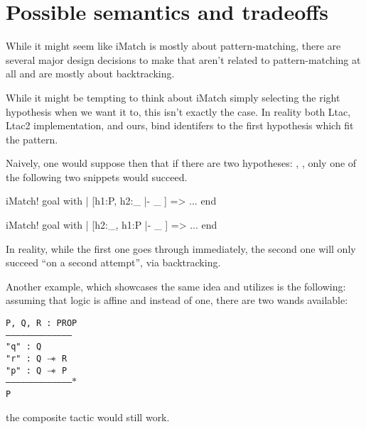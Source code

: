 \section{Possible semantics and tradeoffs}

While it might seem like iMatch is mostly about pattern-matching, there are several major design decisions to make that aren't related to pattern-matching at all and are mostly about backtracking.

While it might be tempting to think about iMatch simply selecting the right hypothesis when we want it to, this isn't exactly the case.
In reality both Ltac, Ltac2 implementation, and ours, bind identifers to the first hypothesis which fit the pattern.

Naively, one would suppose then that if there are two hypotheses: , , only one of the following two snippets would succeed.
\begin{coq}
  iMatch! goal with
  | [h1:P, h2:_ |- _ ] => ...
  end
\end{coq}
\begin{coq}
  iMatch! goal with
  | [h2:_, h1:P |- _ ] => ...
  end
\end{coq}

In reality, while the first one goes through immediately, the second one will only succeed ``on a second attempt'', via backtracking.


Another example, which showcases the same idea and utilizes  is the following: assuming that logic is affine and instead of one, there are two wands available:\\
\begin{minipage}{\linewidth}
\texttt{P, Q, R : PROP\\
---------------------------------------\\
"q" : Q\\
"r" : Q $\mathrel{-\mkern-6mu*}$ R\\
"p" : Q $\mathrel{-\mkern-6mu*}$ P\\
--------------------------------------$\ast$\\
P
}
\end{minipage}

the composite tactic  would still work.


